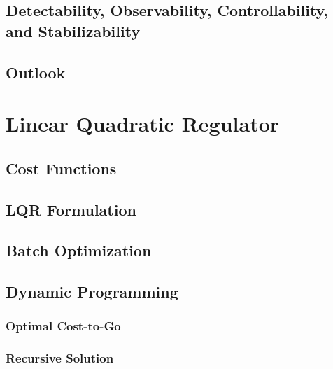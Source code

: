         \subsection{Detectability, Observability, Controllability, and Stabilizability} %

        \subsection{Outlook} %

    \section{Linear Quadratic Regulator} %

        \subsection{Cost Functions} %

        \subsection{LQR Formulation} %

        \subsection{Batch Optimization} %

        \subsection{Dynamic Programming} %

            \subsubsection{Optimal Cost-to-Go} %

            \subsubsection{Recursive Solution} %

